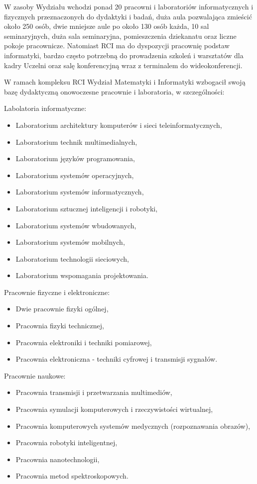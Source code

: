 \documentclass[a4paper,12pt]{article}
\begin{document}
W zasoby Wydziału wchodzi ponad 20 pracowni i laboratoriów informatycznych i fizycznych przeznaczonych do dydaktyki i badań, duża aula pozwalająca zmieścić około 250 osób, dwie mniejsze aule po około 130 osób każda, 10 sal seminaryjnych, duża sala seminaryjna, pomieszczenia dziekanatu oraz liczne pokoje pracownicze. Natomiast RCI ma do dyspozycji pracownię podstaw informatyki, bardzo często potrzebną do prowadzenia szkoleń i warsztatów dla kadry Uczelni oraz salę konferencyjną wraz z terminalem do wideokonferencji.

W ramach kompleksu RCI Wydział Matematyki i Informatyki wzbogacił swoją bazę dydaktyczną onowoczesne pracownie i laboratoria, w szczególności:

Labolatoria informatyczne:
\begin{itemize}
\item Laboratorium architektury komputerów i sieci teleinformatycznych,
\item Laboratorium technik multimedialnych,
\item Laboratorium języków programowania,
\item Laboratorium systemów operacyjnych,
\item Laboratorium systemów informatycznych,
\item Laboratorium sztucznej inteligencji i robotyki,
\item Laboratorium systemów wbudowanych,
\item Laboratorium systemów mobilnych,
\item Laboratorium technologii sieciowych,
\item Laboratorium wspomagania projektowania.
\end{itemize}

Pracownie fizyczne i elektroniczne:
\begin{itemize}
\item Dwie pracownie fizyki ogólnej,
\item Pracownia fizyki technicznej,
\item Pracownia elektroniki i techniki pomiarowej,
\item Pracownia elektroniczna - techniki cyfrowej i transmisji sygnałów.
\end{itemize}

Pracownie naukowe:
\begin{itemize}
\item Pracownia transmisji i przetwarzania multimediów,
\item Pracownia symulacji komputerowych i rzeczywistości wirtualnej,
\item Pracownia komputerowych systemów medycznych (rozpoznawania obrazów),
\item Pracownia robotyki inteligentnej,
\item Pracownia nanotechnologii,
\item Pracownia metod spektroskopowych.
\end{itemize}
\end{document}

